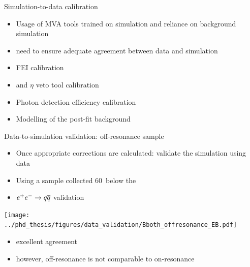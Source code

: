 \documentclass[xcolor=dvipsnames]{beamer}
\begin{document}
\begin{frame}{Simulation-to-data calibration}
   
   \begin{itemize}
      \item Usage of MVA tools trained on simulation and reliance on background simulation
      \item[\ra] need to ensure adequate agreement between data and simulation
   \end{itemize}

   \begin{itemize}
      \item FEI calibration
      \item \piz and $\eta$ veto tool calibration
      \item Photon detection efficiency calibration
      \item Modelling of the post-fit background
   \end{itemize}

\end{frame}

\begin{frame}{Data-to-simulation validation: off-resonance sample}
\scriptsize\centering
   \begin{itemize}
      \item Once appropriate corrections are calculated: validate the simulation using data
      \item Using a sample collected 60~\mev below the \FourS
      \item[\ra] $e^+e^-\rightarrow q\overline q$ validation
   \end{itemize}
\centering
        \texttt{[image: ../phd\_thesis/figures/data\_validation/Bboth\_offresonance\_EB.pdf]}

        \begin{itemize}
         \item[\ra] excellent \EB agreement
         \item[\ra] however, off-resonance \Mbc is not comparable to on-resonance \Mbc
        \end{itemize}

\end{frame}
\end{document}
